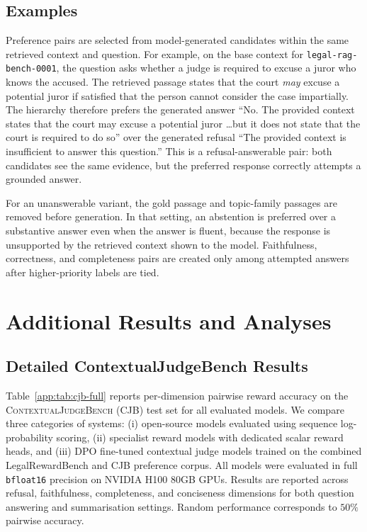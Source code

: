 \documentclass{article}
\theoremstyle{plain}
\theoremstyle{definition}
\theoremstyle{remark}
\begin{document}
\subsection{Examples}
\label{appendix:examples}

Preference pairs are selected from model-generated candidates within the same retrieved context and question.  For example, on the base context for \texttt{legal-rag-bench-0001}, the question asks whether a judge is required to excuse a juror who knows the accused.  The retrieved passage states that the court \emph{may} excuse a potential juror if satisfied that the person cannot consider the case impartially.  The hierarchy therefore prefers the generated answer ``No. The provided context states that the court may excuse a potential juror \ldots but it does not state that the court is required to do so'' over the generated refusal ``The provided context is insufficient to answer this question.''  This is a refusal-answerable pair: both candidates see the same evidence, but the preferred response correctly attempts a grounded answer.

For an unanswerable variant, the gold passage and topic-family passages are removed before generation.  In that setting, an abstention is preferred over a substantive answer even when the answer is fluent, because the response is unsupported by the retrieved context shown to the model.  Faithfulness, correctness, and completeness pairs are created only among attempted answers after higher-priority labels are tied.

\section{Additional Results and Analyses}
\label{app:additional-results}

\subsection{Detailed ContextualJudgeBench Results}
\label{app:cjb-full}

Table~\ref{app:tab:cjb-full} reports per-dimension pairwise reward accuracy on the \textsc{ContextualJudgeBench} (CJB) test set for all evaluated models. We compare three categories of systems: (i) open-source models evaluated using sequence log-probability scoring, (ii) specialist reward models with dedicated scalar reward heads, and (iii) DPO fine-tuned contextual judge models trained on the combined LegalRewardBench and CJB preference corpus. All models were evaluated in full \texttt{bfloat16} precision on NVIDIA H100 80GB GPUs. Results are reported across refusal, faithfulness, completeness, and conciseness dimensions for both question answering and summarisation settings. Random performance corresponds to $50\%$ pairwise accuracy.
\end{document}
